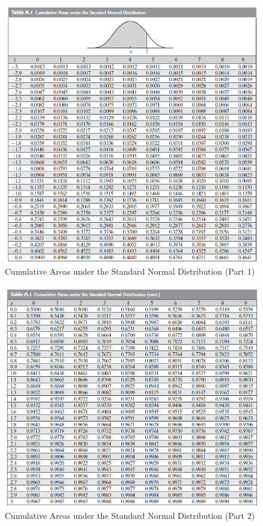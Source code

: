 \documentclass[12pt]{article}
\begin{document}
\begin{figure}[ht]
  \centering
  \includegraphics[width=\textwidth]{images/z-table_1.png}
  \caption{Cumulative Areas under the Standard Normal Distribution (Part 1)}
\end{figure}

\begin{figure}[ht]
  \centering
  \includegraphics[width=\textwidth]{images/z-table_2.png}
  \caption{Cumulative Areas under the Standard Normal Distribution (Part 2)}
\end{figure}
\end{document}
